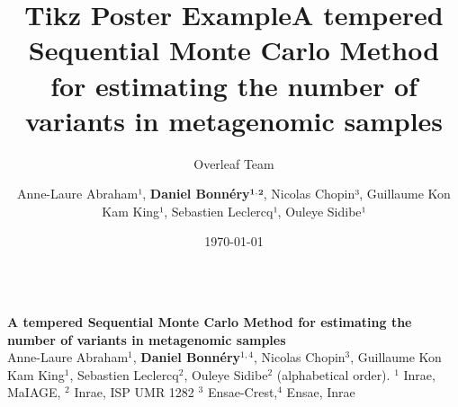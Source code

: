 \documentclass[20pt, a0paper, portrait,colspace=5pt,blockverticalspace=5pt]{tikzposter}
\title{Tikz Poster Example}
\author{Overleaf Team}
\date{\today}
\institute{Overleaf Institute}
\title{A tempered Sequential Monte Carlo Method for estimating the number of
variants in metagenomic samples}
\author{Anne-Laure Abraham¹, {\bf Daniel Bonnéry¹$^,$²}, Nicolas Chopin³, Guillaume Kon Kam King¹, Sebastien Leclercq¹, Ouleye Sidibe¹}
\begin{document}
\makeatletter
    \setlength{\TP@blocktop}{.48\textheight}
\makeatother

\begin{columns}
\block{}{\vspace*{-4cm}
}
\block{}
{\color{color1}
\vspace*{-3cm}
    {\Huge \bf A tempered Sequential Monte Carlo Method for \mbox{estimating} the number of
variants in metagenomic \mbox{samples}}\\

\Large 
Anne-Laure Abraham$^{1}$, {\bf Daniel Bonnéry$^{1,4}$}, Nicolas Chopin$^{3}$, Guillaume Kon Kam King$^{1}$, Sebastien Leclercq$^{2}$, Ouleye Sidibe$^{2}$ \small(alphabetical order). \hspace*{1cm}\normalsize $^1$ Inrae, MaIAGE, $^2$  Inrae, ISP UMR 1282 $^3$ Ensae-Crest,$^4$ Ensae, Inrae
}
\block{}{\vspace*{-3cm}



}
\end{columns}
\vspace*{.5cm}
\end{document}
